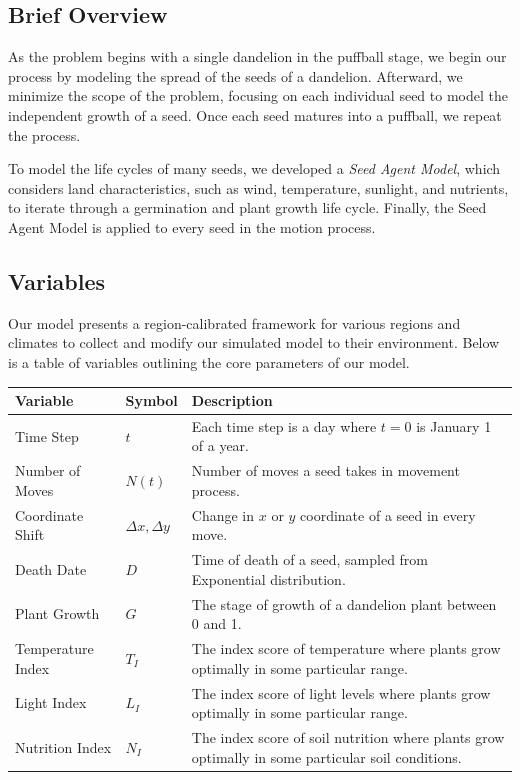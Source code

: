 \subsection{Brief Overview}
As the problem begins with a single dandelion in the puffball stage, we begin our process by modeling the spread of the seeds of a dandelion. Afterward, we minimize the scope of the problem, focusing on each individual seed to model the independent growth of a seed. Once each seed matures into a puffball, we repeat the process.

To model the life cycles of many seeds, we developed a \textit{Seed Agent Model}, which considers land characteristics, such as wind, temperature, sunlight, and nutrients, to iterate through a germination and plant growth life cycle. Finally, the Seed Agent Model is applied to every seed in the motion process.

\subsection{Variables}

Our model presents a region-calibrated framework for various regions and climates to collect and modify our simulated model to their environment. Below is a table of variables outlining the core parameters of our model.

\begin{table}[h]
\renewcommand{\arraystretch}{1.3}
    \begin{tabularx}{\textwidth}{p{} lX}
    \toprule
    \textbf{Variable}           & \textbf{Symbol} & \textbf{Description}  \\ \midrule
    \raggedright Time Step & $t$  & Each time step is a day where \(t = 0\) is January 1 of a year. \\
    \rowcolor{gray!15}
    \raggedright Number of Moves & $N(t)$  & Number of moves a seed takes in movement process. \\
    Coordinate Shift & $\Delta x, \Delta y$    &  Change in \(x\) or \(y\) coordinate of a seed in every move.  \\
    \rowcolor{gray!15} \raggedright  Death Date & $D$               &  Time of death of a seed, sampled from Exponential distribution.  \\
    \raggedright Plant Growth & $G$ & The stage of growth of a dandelion plant between 0 and 1. \\
    \rowcolor{gray!15} \raggedright Temperature Index & $T_I$ & The index score of temperature where plants grow optimally in some particular range. \\
    \raggedright Light Index & $L_I$ & The index score of light levels where plants grow optimally in some particular range. \\
    \rowcolor{gray!15} \raggedright Nutrition Index & $N_I$ & The index score of soil nutrition where plants grow optimally in some particular soil conditions. \\
    \bottomrule
    \end{tabularx}
\end{table}

